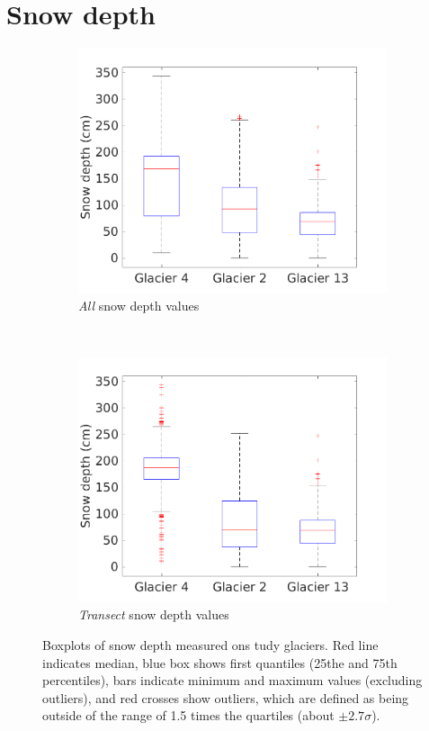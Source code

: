 \documentclass[12pt]{article}
\begin{document}
\section{Snow depth}

\begin{figure}
    \centering
    \begin{subfigure}[b]{0.48\textwidth}
        \includegraphics[width=\textwidth]{box_depth_wZZ.png}
        \caption{ \textit{All} snow depth values}
        \label{fig:box_depth_wZZ}
    \end{subfigure}
    ~
    \begin{subfigure}[b]{0.48\textwidth}
        \includegraphics[width=\textwidth]{box_depth_noZZ.png}
        \caption{\textit{Transect} snow depth values}
        \label{fig:box_depth_noZZ}
    \end{subfigure}

    \caption{Boxplots of snow depth measured ons tudy glaciers. Red line indicates median, blue box shows first quantiles (25the and 75th percentiles), bars indicate minimum and maximum values (excluding outliers), and red crosses show outliers, which are defined as being outside of the range of 1.5 times the quartiles (about $\pm2.7\sigma$).}
    \label{fig:box_depth}
\end{figure}
\end{document}
